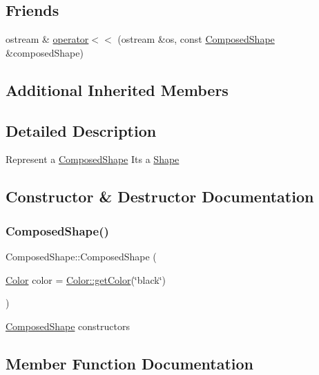 \subsection*{Friends}
\begin{DoxyCompactItemize}
\item 
ostream \& \hyperlink{class_composed_shape_a68ff1b04d83134ec6f6e949b45b63016}{operator$<$$<$} (ostream \&os, const \hyperlink{class_composed_shape}{Composed\+Shape} \&composed\+Shape)
\end{DoxyCompactItemize}
\subsection*{Additional Inherited Members}


\subsection{Detailed Description}
Represent a \hyperlink{class_composed_shape}{Composed\+Shape} It\textquotesingle{}s a \hyperlink{class_shape}{Shape} 

\subsection{Constructor \& Destructor Documentation}
\hypertarget{class_composed_shape_a048c0d943a560bba5f5b4c9d9a18afc9}{}\label{class_composed_shape_a048c0d943a560bba5f5b4c9d9a18afc9} 
\subsubsection{\texorpdfstring{Composed\+Shape()}{ComposedShape()}}
{\footnotesize\ttfamily Composed\+Shape\+::\+Composed\+Shape (\begin{DoxyParamCaption}\item[{\hyperlink{class_color}{Color}}]{color = {\ttfamily \hyperlink{class_color_a94697e8c9eb81124c5a7c1439e1e7348}{Color\+::get\+Color}(\char`\"{}black\char`\"{})} }\end{DoxyParamCaption})}

\hyperlink{class_composed_shape}{Composed\+Shape} constructors 

\subsection{Member Function Documentation}
\hypertarget{class_composed_shape_a5f78e498ae77eeefc868d28ae8c8aa99}{}\label{class_composed_shape_a5f78e498ae77eeefc868d28ae8c8aa99} 
